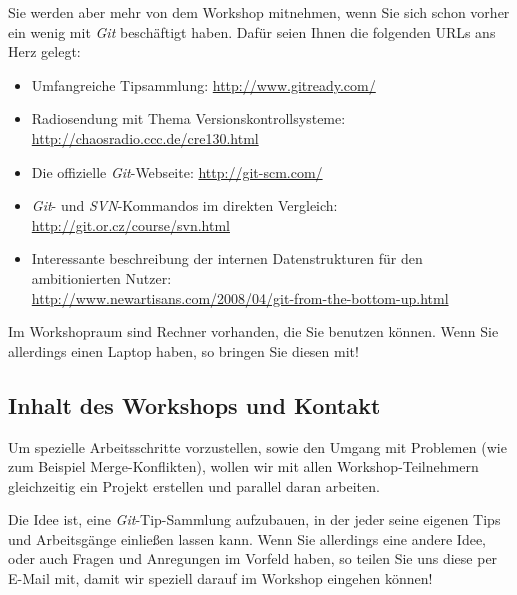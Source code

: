 \documentclass[11pt,            %
               a4paper,         %
               oneside,         %
               DIV12,           %
               fleqn,           %
               smallheadings,   %
               halfparskip,     %
               nochapterprefix, %
               bibtotocnumbered,%
              ]{scrartcl} %
\begin{document}
Sie werden aber mehr von dem Workshop mitnehmen, wenn Sie sich schon
vorher ein wenig mit \emph{Git} beschäftigt haben. Dafür seien Ihnen
die folgenden URLs ans Herz gelegt:

\begin{itemize}
\item Umfangreiche Tipsammlung:
  \url{http://www.gitready.com/}
\item Radiosendung mit Thema Versionskontrollsysteme:\\
  \url{http://chaosradio.ccc.de/cre130.html}
\item Die offizielle \emph{Git}-Webseite:
  \url{http://git-scm.com/}
\item \emph{Git}- und \emph{SVN}-Kommandos im direkten Vergleich:\\
  \url{http://git.or.cz/course/svn.html}
\item Interessante beschreibung der internen Datenstrukturen für den ambitionierten Nutzer:\\
    \url{http://www.newartisans.com/2008/04/git-from-the-bottom-up.html}
\end{itemize}

Im Workshopraum sind Rechner vorhanden, die Sie benutzen können. Wenn
Sie allerdings einen Laptop haben, so bringen Sie diesen mit!





\subsection*{Inhalt des Workshops und Kontakt}

Um spezielle Arbeitsschritte vorzustellen, sowie den Umgang mit
Problemen (wie zum Beispiel Merge-Konflikten), wollen wir mit allen
Workshop-Teilnehmern gleichzeitig ein Projekt erstellen und parallel
daran arbeiten.

Die Idee ist, eine \emph{Git}-Tip-Sammlung aufzubauen, in der jeder
seine eigenen Tips und Arbeitsgänge einließen lassen kann.
Wenn Sie allerdings eine andere Idee, oder auch Fragen und Anregungen
im Vorfeld haben, so teilen Sie uns diese per E-Mail mit, damit wir
speziell darauf im Workshop eingehen können!
\end{document}
